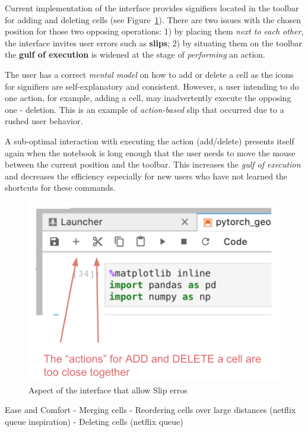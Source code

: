 \documentclass[12pt,letterpaper]{article}
\begin{document}
Current implementation of the interface provides signifiers located in the toolbar for adding and deleting cells (see Figure~\ref{fig::2}). There are two issues with the chosen position for those two opposing operations: 1) by placing them \textit{next to each other}, the interface invites user errors such as \textbf{slips}; 2) by situating them on the toolbar the \textbf{gulf of execution} is widened at the stage of \textit{performing} an action.

The user has a correct \textit{mental model} on how to add or delete a cell as the icons for signifiers are self-explanatory and consistent. However, a user intending to do one action, for example, adding a cell, may inadvertently execute the opposing one - deletion. This is an example of \textit{action-based} slip that occurred due to a rushed user behavior. 

A sub-optimal interaction with executing the action (add/delete) presents itself again when the notebook is long enough that the user needs to move the mouse between the current position and the toolbar. This increases the \textit{gulf of execution} and decreases the efficiency especially for new users who have not learned the shortcuts for these commands.  

\begin{figure}[h]
\centering
\includegraphics[scale=.6]{figures/project-principles/jupyter_add_delete.png}
\caption{Aspect of the interface that allow Slip erros}
\label{fig::2}
\end{figure}

Ease and Comfort
- Merging cells 
- Reordering cells over large distances (netflix queue inspiration)
- Deleting cells (netflix queue)
\end{document}
